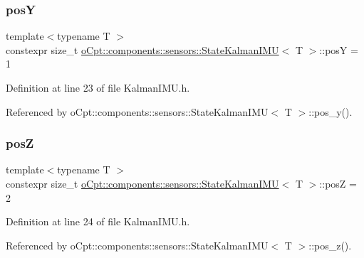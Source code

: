\subsubsection{\texorpdfstring{posY}{posY}}
{\footnotesize\ttfamily template$<$typename T $>$ \\
constexpr size\+\_\+t \hyperlink{classo_cpt_1_1components_1_1sensors_1_1_state_kalman_i_m_u}{o\+Cpt\+::components\+::sensors\+::\+State\+Kalman\+I\+MU}$<$ T $>$\+::posY = 1\hspace{0.3cm}{\ttfamily [static]}}



Definition at line 23 of file Kalman\+I\+M\+U.\+h.



Referenced by o\+Cpt\+::components\+::sensors\+::\+State\+Kalman\+I\+M\+U$<$ T $>$\+::pos\+\_\+y().

\hypertarget{classo_cpt_1_1components_1_1sensors_1_1_state_kalman_i_m_u_a5d55d2f9d87636f0b32cdfd1e9acef0a}{}\label{classo_cpt_1_1components_1_1sensors_1_1_state_kalman_i_m_u_a5d55d2f9d87636f0b32cdfd1e9acef0a} 
\subsubsection{\texorpdfstring{posZ}{posZ}}
{\footnotesize\ttfamily template$<$typename T $>$ \\
constexpr size\+\_\+t \hyperlink{classo_cpt_1_1components_1_1sensors_1_1_state_kalman_i_m_u}{o\+Cpt\+::components\+::sensors\+::\+State\+Kalman\+I\+MU}$<$ T $>$\+::posZ = 2\hspace{0.3cm}{\ttfamily [static]}}



Definition at line 24 of file Kalman\+I\+M\+U.\+h.



Referenced by o\+Cpt\+::components\+::sensors\+::\+State\+Kalman\+I\+M\+U$<$ T $>$\+::pos\+\_\+z().

\hypertarget{classo_cpt_1_1components_1_1sensors_1_1_state_kalman_i_m_u_a6534206c4f7f2c52b96a413e74026349}{}\label{classo_cpt_1_1components_1_1sensors_1_1_state_kalman_i_m_u_a6534206c4f7f2c52b96a413e74026349} 
